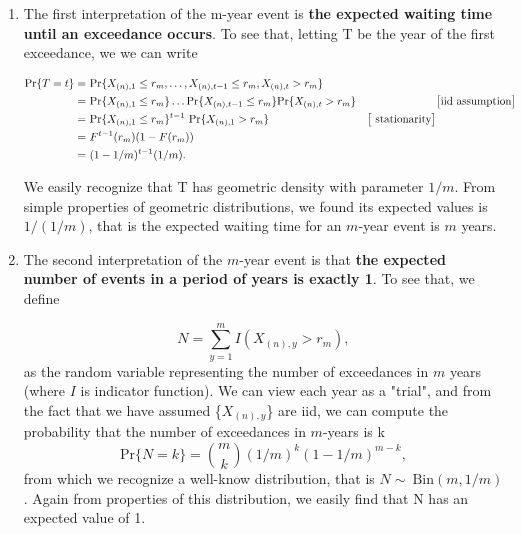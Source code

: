 \documentclass[11pt,a4paper,openany ]{book}
\begin{document}
\begin{enumerate}
	\item The first interpretation of the m-year event is \textbf{the expected waiting time until an exceedance occurs}. To see that, letting T be the year of the first exceedance, we we can write
	
	\begin{equation}
	\begin{aligned}
	\text{Pr}\{T=t\}=\  & \text{Pr}\{X_{(n),1}\leq r_m,\dots,X_{(n),t-1}\leq r_m,X_{(n),t}>r_m\} \\
	=\ & \text{Pr}\{X_{(n),1}\leq r_m\}\dots\text{Pr}\{X_{(n),t-1}\leq r_m\}\text{Pr}\{X_{(n),t}>r_m\}& & \big[ \textnormal{iid assumption}\big]\\
	= \ & \text{Pr}\{X_{(n),1}\leq r_m\}^{t-1}\ \text{Pr}\{X_{(n),1}>r_m\} &  \big[ \text{ stationarity}\big]\\
	=\ & F^{t-1}(r_m)(1-F(r_m))\\
	=\ & (1-1/m)^{t-1}(1/m).
	\end{aligned}
	\end{equation}
	
	
	We easily recognize that T has geometric density with parameter $1/m$. From simple properties of geometric distributions, we found its expected values is $1/(1/m)$, that is the expected waiting time for an $m$-year event is $m$ years.
	
	\item The second interpretation of the $m$-year event is that \textbf{the expected number of events in a period of  years is exactly 1}. To see that, we define  
	
	\begin{equation*}N=\sum_{y=1}^m I(X_{(n),y}>r_m),
	\end{equation*}
	as the random variable representing the number of exceedances in $m$ years (where $I$ is indicator function). We can view each year as a "trial", and from the fact that we have assumed \big\{$X_{(n),y}$\big\} are iid, we can compute the probability that the number of exceedances in $m$-years is k
	\begin{equation*}
	\text{Pr}\{N=k\}=\binom{m}{k}(1/m)^k(1-1/m)^{m-k},
	\end{equation*}
	from which we recognize a well-know distribution, that is $N\sim \ \text{Bin}(m,1/m)$. Again from properties of this distribution, we easily find that N has an expected value of 1.
	
\end{enumerate}
\end{document}
